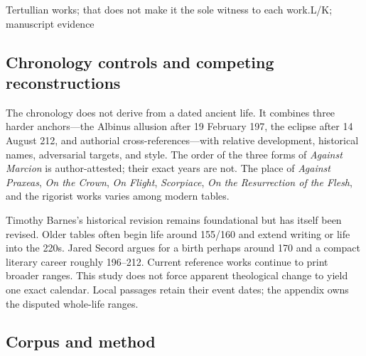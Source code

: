 \begin{biotimeline}
{Tertullian works; that does not make it the sole witness to each work.}{L/K;
manuscript evidence}
\end{biotimeline}

\subsection{Chronology controls and competing reconstructions}

The chronology does not derive from a dated ancient life. It combines three
harder anchors---the Albinus allusion after 19 February 197, the eclipse after
14 August 212, and authorial cross-references---with relative development,
historical names, adversarial targets, and style. The order of the three forms
of \emph{Against Marcion} is author-attested; their exact years are not. The
place of \emph{Against Praxeas}, \emph{On the Crown}, \emph{On Flight},
\emph{Scorpiace}, \emph{On the Resurrection of the Flesh}, and the rigorist
works varies among modern tables.

Timothy Barnes's historical revision remains foundational but has itself been
revised. Older tables often begin life around 155/160 and extend writing or life
into the 220s. Jared Secord argues for a birth perhaps around 170 and a compact
literary career roughly 196--212. Current reference works continue to print
broader ranges. This study does not force apparent theological change to yield
one exact calendar. Local passages retain their event dates; the appendix owns
the disputed whole-life ranges.

\subsection{Corpus and method}


